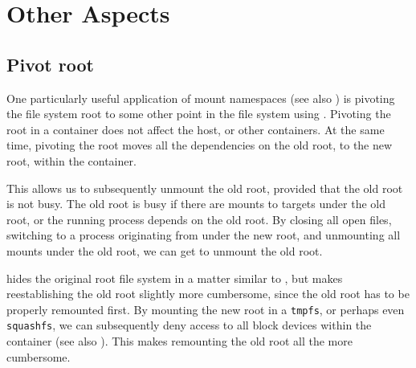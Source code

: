 
\section{Other Aspects}

\subsection{Pivot root}

One particularly useful application of mount namespaces (see also
) is pivoting the file system root to some other
point in the file system using \cite{man-2-pivot-root}. Pivoting the root in a
container does not affect the host, or other containers. At the same time,
pivoting the root moves all the dependencies on the old root, to the new root,
within the container.

This allows us to subsequently unmount the old root, provided that the old root
is not busy. The old root is busy if there are mounts to targets under the old
root, or the running process depends on the old root.  By closing all open
files, switching to a process originating from under the new root, and
unmounting all mounts under the old root, we can get to unmount the old root.

\cite{man-2-pivot-root} hides the original root file system in a matter similar
to \cite{man-2-chroot}, but makes reestablishing the old root slightly more
cumbersome, since the old root has to be properly remounted first. By mounting
the new root in a \texttt{tmpfs}, or perhaps even \texttt{squashfs}, we can
subsequently deny access to all block devices within the container (see also
). This makes remounting the old root
all the more cumbersome.

